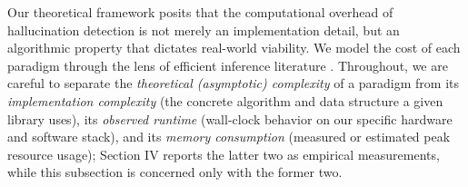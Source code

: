 \documentclass[conference]{IEEEtran}
\begin{document}
Our theoretical framework posits that the computational overhead of hallucination detection is not merely an implementation detail, but an algorithmic property that dictates real-world viability. We model the cost of each paradigm through the lens of efficient inference literature \cite{zhou2024efficient, kwon2023efficient}. Throughout, we are careful to separate the \emph{theoretical (asymptotic) complexity} of a paradigm from its \emph{implementation complexity} (the concrete algorithm and data structure a given library uses), its \emph{observed runtime} (wall-clock behavior on our specific hardware and software stack), and its \emph{memory consumption} (measured or estimated peak resource usage); Section IV reports the latter two as empirical measurements, while this subsection is concerned only with the former two.
\end{document}
